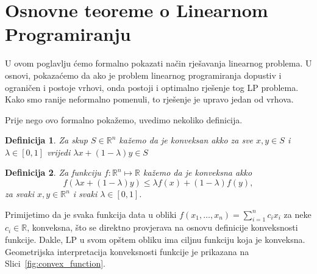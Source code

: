 \documentclass[a4paper, utf8, 11pt, colorlinks]{book}
\newtheorem{definition}{Definicija}
\begin{document}
\section{Osnovne teoreme o Linearnom Programiranju}
U ovom poglavlju ćemo formalno pokazati način rješavanja linearnog problema. U osnovi, pokazaćemo da ako je problem
linearnog programiranja dopustiv i ograničen i postoje vrhovi, onda postoji i optimalno rješenje tog LP problema. Kako smo ranije neformalno pomenuli,  to rješenje je upravo jedan od vrhova. 

Prije nego ovo formalno pokažemo, uvedimo nekoliko definicija. 

\begin{definition}
  Za skup $S \in \mathbb{R}^n$ kažemo da je konveksan akko za sve $x,y\in S$ i $\lambda\in [0, 1]$ vrijedi $\lambda x + (1 - \lambda)y \in S$
\end{definition}
\begin{definition}
   Za funkciju $f:\mathbb{R}^n \mapsto \mathbb{R}$ kažemo da je konveksna akko 
   $$ f( \lambda x + (1-\lambda) y) \leq \lambda f(x) + (1 -\lambda) f(y),$$
   za svaki $x,y \in \mathbb{R}^n$ i svaki $\lambda \in [0,1].$
\end{definition}
Primijetimo da je svaka funkcija data u obliki $f(x_1, \ldots, x_n) = \sum_{i=1}^n c_i x_i$ za neke $c_i \in \mathbb{R}$, konveksna, što se direktno provjerava na osnovu definicije konveksnosti funkcije. Dakle, LP u svom opštem obliku  ima ciljnu funkciju koja je konveksna. Geometrijska interpretacija konveksnosti funkcije je prikazana na Slici~\ref{fig:convex_function}.
\end{document}
